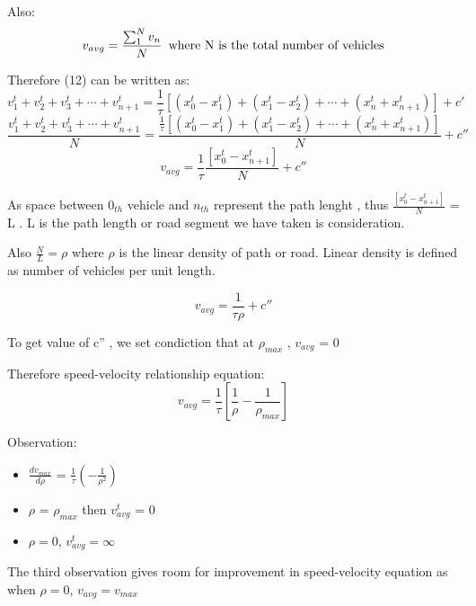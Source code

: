 \documentclass[12pt, letterpaper]{article}
\begin{document}
Also:  
\begin{equation}
v_{avg} =  \frac{\sum _1 ^N v_n}{N}  \textrm{\hspace{5pt}where N is the total number of vehicles}
\end{equation}
 
 Therefore (12) can be written as:
 \begin{equation}
 v_1 ^t + v_2 ^t + v_3 ^t + \cdots + v_{n+1} ^t = \frac{1}{\tau} [(x_0 ^t  - x_1^t) + (x_1 ^t - x_2 ^t) + \cdots + (x_n ^t + x_{n+1} ^t)] + c'
 \end {equation}  
 \begin{equation}
 \frac{ v_1 ^t + v_2 ^t + v_3 ^t + \cdots + v_{n+1} ^t }{N} = \frac{\frac{1}{\tau} [(x_0 ^t  - x_1^t) + (x_1 ^t - x_2 ^t) + \cdots + (x_n ^t + x_{n+1} ^t)]} {N} + c''
 \end{equation}
 \begin{equation}
 v_{avg} = \frac{1}{\tau} \frac{[x_0 ^t - x_{n+1} ^t]}{N} + c''
  \end{equation}
  
  As space between $0_{th} $ vehicle and $n_{th}$ represent the path lenght ,
  thus $ \frac{[x_0 ^t - x_{n+1} ^t]}{N} $ = L .  L is the path length or road segment we have taken is consideration.
  
  Also $\frac{N}{L} = \rho$ where $\rho$ is the linear density of path or road. Linear density is defined as number of vehicles per unit length.
  
  \begin{equation}
  v_{avg} = \frac{1}{\tau \rho} + c''
  \end{equation} 
 
To get value of c'' ,  we set condiction that at $\rho_{max}$ , $v_{avg}$ = 0
  
 Therefore speed-velocity relationship equation:
  \begin{equation}
  v_{avg} = \frac{1}{\tau}[\frac{1}{\rho} - \frac{1}{\rho_{max}}]
  \end{equation}
  
Observation:
\begin{itemize}
\item $\frac{dv_{max}}{d\rho}$ = $\frac{1}{\tau} (-\frac{1}{\rho ^2})$
\item $\rho$ = $\rho_{max}$ then $v_{avg} ^t$ = 0
\item $\rho = 0 $, $v_{avg} ^t= \infty$
\end{itemize}

The third observation gives room for improvement in speed-velocity equation as when $ \rho = 0$, $v_{avg} = v_{max}$
\end{document}
